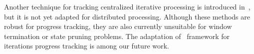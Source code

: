 Another technique for tracking centralized iterative processing is introduced in~\cite{chandramouli2014trill}, but it is not yet adapted for distributed processing. Although these methods are robust for progress tracking, they are also currently unsuitable for window termination or state pruning problems. The adaptation of \tracker\ framework for iterations progress tracking is among our future work.




